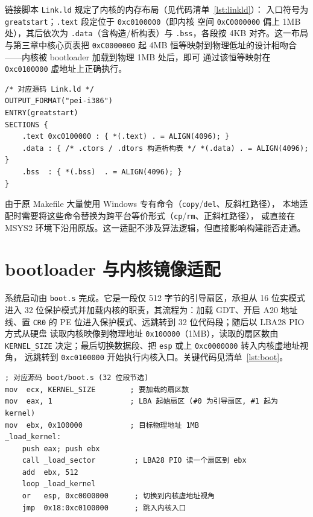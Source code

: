 链接脚本 \texttt{Link.ld} 规定了内核的内存布局（见代码清单~\ref{lst:linkld}）：
入口符号为 \texttt{greatstart}；\texttt{.text} 段定位于 \texttt{0xc0100000}（即内核
空间 \texttt{0xC0000000} 偏上 1MB 处），其后依次为 \texttt{.data}（含构造/析构表）与
\texttt{.bss}，各段按 4KB 对齐。这一布局与第三章中核心页表把 \texttt{0xC0000000} 起
4MB 恒等映射到物理低址的设计相吻合——内核被 bootloader 加载到物理 1MB 处后，即可
通过该恒等映射在 \texttt{0xc0100000} 虚地址上正确执行。

\begin{lstlisting}[caption={Link.ld 的关键约束},label={lst:linkld}]
/* 对应源码 Link.ld */
OUTPUT_FORMAT("pei-i386")
ENTRY(greatstart)
SECTIONS {
    .text 0xc0100000 : { *(.text) . = ALIGN(4096); }
    .data : { /* .ctors / .dtors 构造析构表 */ *(.data) . = ALIGN(4096); }
    .bss  : { *(.bss)  . = ALIGN(4096); }
}
\end{lstlisting}

由于原 Makefile 大量使用 Windows 专有命令（\texttt{copy}/\texttt{del}、反斜杠路径），
本地适配时需要将这些命令替换为跨平台等价形式（\texttt{cp}/\texttt{rm}、正斜杠路径），
或直接在 MSYS2 环境下沿用原版。这一适配不涉及算法逻辑，但直接影响构建能否走通。

\section{bootloader 与内核镜像适配}
系统启动由 \texttt{boot.s} 完成。它是一段仅 512 字节的引导扇区，承担从 16 位实模式
进入 32 位保护模式并加载内核的职责，其流程为：加载 GDT、开启 A20 地址线、置
\texttt{CR0} 的 PE 位进入保护模式、远跳转到 32 位代码段；随后以 LBA28 PIO 方式从硬盘
读取内核映像到物理地址 \texttt{0x100000}（1MB），读取的扇区数由 \texttt{KERNEL\_SIZE}
决定；最后切换数据段、把 \texttt{esp} 或上 \texttt{0xc0000000} 转入内核虚地址视角，
远跳转到 \texttt{0xc0100000} 开始执行内核入口。关键代码见清单~\ref{lst:boot}。

\begin{lstlisting}[caption={boot.s 加载内核的核心逻辑},label={lst:boot}]
; 对应源码 boot/boot.s (32 位段节选)
mov  ecx, KERNEL_SIZE        ; 要加载的扇区数
mov  eax, 1                  ; LBA 起始扇区 (#0 为引导扇区, #1 起为 kernel)
mov  ebx, 0x100000           ; 目标物理地址 1MB
_load_kernel:
    push eax; push ebx
    call _load_sector         ; LBA28 PIO 读一个扇区到 ebx
    add  ebx, 512
    loop _load_kernel
    or   esp, 0xc0000000      ; 切换到内核虚地址视角
    jmp  0x18:0xc0100000      ; 跳入内核入口
\end{lstlisting}

